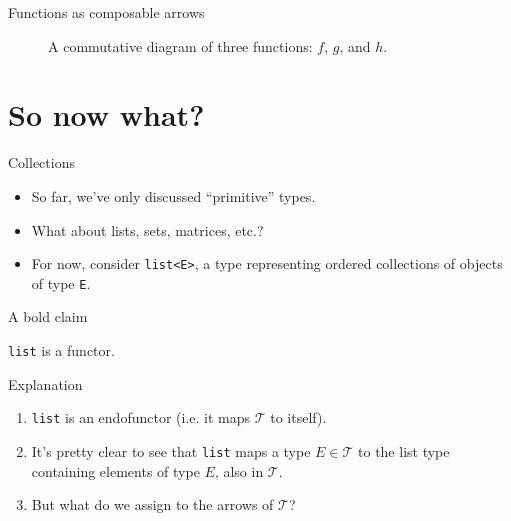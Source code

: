\documentclass[10pt]{beamer}
\begin{document}
\begin{frame}[fragile]{Functions as composable arrows}
  \begin{figure}[H]
    \centering
    \caption{A commutative diagram of three functions: \(f\), \(g\), and \(h\).}
  \end{figure}
\end{frame}

\section{So now what?}

\begin{frame}{Collections}
  \begin{itemize}
  \item So far, we've only discussed ``primitive'' types.
  \item What about lists, sets, matrices, etc.?
  \item For now, consider \texttt{list<E>}, a type representing ordered collections of objects of type \texttt{E}.
  \end{itemize}
\end{frame}

\begin{frame}{A bold claim}
  \begin{center}
    \Huge{\texttt{list} is a functor}.
  \end{center}
\end{frame}

\begin{frame}{Explanation}
  \begin{enumerate}
  \item \texttt{list} is an endofunctor (i.e. it maps \(\mathcal{T}\) to itself).
  \item It's pretty clear to see that \texttt{list} maps a type \(E \in \mathcal{T}\) to the list type containing elements of type \(E\), also in \(\mathcal T\).
  \item But what do we assign to the arrows of \(\mathcal T\)?
  \end{enumerate}
\end{frame}
\end{document}
